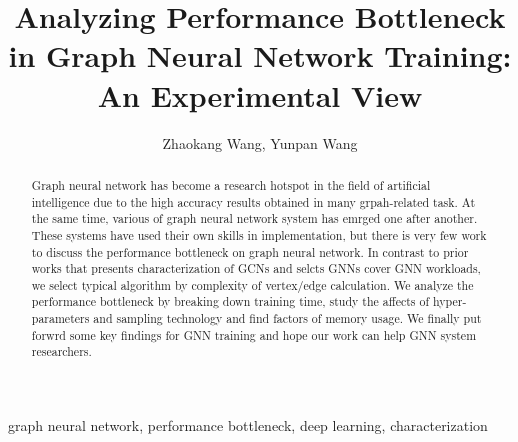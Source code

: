 \documentclass{elsarticle}
\begin{document}
\begin{frontmatter}

\title{Analyzing Performance Bottleneck in Graph Neural Network Training: An Experimental View}
\author{Zhaokang Wang, Yunpan Wang}
\address{State Key Laboratory for Novel Software Technology, Department of Computer Science and Technology, Nanjing University, Nanjing 210023, China}

\begin{abstract}
    Graph neural network has become a research hotspot in the field of artificial intelligence due to the high accuracy results 
    obtained in many grpah-related task. At the same time, various of graph neural network system has emrged one after another.
    These systems have used their own skills in implementation, but there is very few work to discuss the performance bottleneck
    on graph neural network. In contrast to prior works that presents characterization of GCNs and selcts GNNs cover GNN workloads,
    we select typical algorithm by complexity of vertex/edge calculation. We analyze the performance bottleneck by breaking down training
    time, study the affects of hyper-parameters and sampling technology and find factors of memory usage. We finally put forwrd some key
    findings for GNN training and hope our work can help GNN system researchers. 
\end{abstract}

\begin{keyword}
    graph neural network, performance bottleneck, deep learning, characterization
\end{keyword}

\end{frontmatter}

\linenumbers











\end{document}
